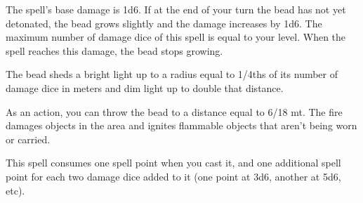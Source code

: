     The spell's base damage is 1d6.
    If at the end of your turn the bead has not yet detonated, the bead grows slightly and the damage increases by 1d6.
    The maximum number of damage dice of this spell is equal to your level.
    When the spell reaches this damage, the bead stops growing.

    The bead sheds a bright light up to a radius equal to 1/4ths of its number of damage dice in meters and dim light up to double that distance.

    As an action, you can throw the bead to a distance equal to 6/18 mt.
    The fire damages objects in the area and ignites flammable objects that aren't being worn or carried.

    This spell consumes one spell point when you cast it, and one additional spell point for each two damage dice added to it (one point at 3d6, another at 5d6, etc).
